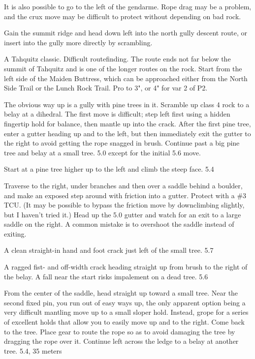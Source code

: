 \documentclass{tahquitz}
\begin{document}
 It is also possible to go to the left of the gendarme.
Rope drag may be a problem, and the crux move may be difficult to protect
without depending on bad rock.

Gain the summit ridge and head down left into the north gully descent route,
or insert into the gully more directly by scrambling.





A Tahquitz classic. Difficult routefinding. The route ends not far
below the summit of Tahquitz and is one of the longer routes on the
rock. Start from the left side of the Maiden Buttress, which can be
approached either from the North Side Trail or the Lunch Rock Trail.
Pro to 3", or 4" for var 2 of P2.

 The obvious way up is a gully with pine trees in it. Scramble up
class 4 rock to a belay at a dihedral. The first move is difficult;
step left first using a hidden fingertip hold for balance, then mantle
up into the crack.
After the first pine tree, enter a gutter heading up
and to the left, but then immediately exit the gutter to the right to
avoid getting the rope snagged in brush. Continue past a big pine
tree and belay at a small tree. 5.0 except for the initial 5.6
move.

 Start at a pine tree higher up to the left and climb
the steep face. 5.4

 Traverse to the right, under branches and then over a saddle behind a boulder, and make
an exposed step around with friction into a gutter.  Protect with a
\#3 TCU. (It may be possible to bypass the friction move by downclimbing
slightly, but I haven't tried it.) Head up the 5.0 gutter and watch for an exit to a large saddle
on the right. A common mistake is to overshoot the saddle instead of
exiting.

 A clean straight-in hand and foot crack just left of the small
tree. 5.7

 A ragged fist- and off-width crack heading straight up from brush
to the right of the belay. A fall near the start risks impalement on a dead tree. 5.6

 From the center of the saddle, head straight up toward a small
tree. Near the second fixed pin, you run out of easy ways up, the
only apparent option being a very difficult mantling move up to a
small sloper hold. Instead, grope for a series of excellent holds that allow
you to easily move up and to the right. Come back to the tree. Place
gear to route the rope so as to avoid damaging the tree by dragging
the rope over it. Continue left across the ledge to a belay at
another tree. 5.4, 35 meters
\end{document}
